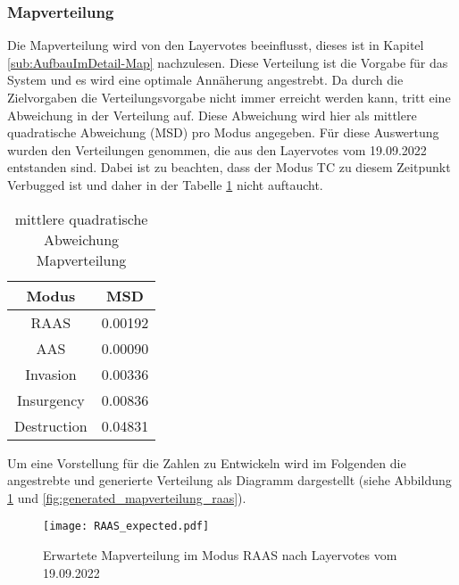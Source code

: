         \subsubsection{Mapverteilung}
            Die Mapverteilung wird von den Layervotes beeinflusst, dieses ist in Kapitel \ref{sub:AufbauImDetail-Map} nachzulesen.
            Diese Verteilung ist die Vorgabe für das System und es wird eine optimale Annäherung angestrebt. Da durch die
            Zielvorgaben die Verteilungsvorgabe nicht immer erreicht werden kann, tritt eine Abweichung in der Verteilung auf.
            Diese Abweichung wird hier als mittlere quadratische Abweichung (MSD) pro Modus angegeben.
            Für diese Auswertung wurden den Verteilungen genommen, die aus den Layervotes vom 19.09.2022 entstanden sind.
            Dabei ist zu beachten, dass der Modus TC zu diesem Zeitpunkt \glqq{}Verbugged\grqq{} ist und daher
            in der Tabelle \ref{t:Ergebnisse:fehler_Mapverteilung} nicht auftaucht.\\
            \begin{table}[h]
                \centering
                \begin{tabular}{|| c c ||}
                    \hline
                    Modus & MSD \\
                    \hline
                    \hline
                    RAAS & 0.00192 \\
                    \hline
                    AAS & 0.00090 \\
                    \hline
                    Invasion & 0.00336 \\
                    \hline
                    Insurgency & 0.00836 \\
                    \hline
                    Destruction & 0.04831 \\
                    \hline
                \end{tabular}
                \caption{mittlere quadratische Abweichung Mapverteilung}
                \label{t:Ergebnisse:fehler_Mapverteilung}
            \end{table}

            Um eine Vorstellung für die Zahlen zu Entwickeln wird im Folgenden die angestrebte und generierte Verteilung als
            Diagramm dargestellt (siehe Abbildung \ref{fig:expected_mapverteilung_raas}
            und \ref{fig:generated_mapverteilung_raas}).

            \begin{figure}[htbp]
                \centering
                \texttt{[image: RAAS\_expected.pdf]}
                \caption{Erwartete Mapverteilung im Modus RAAS nach Layervotes vom 19.09.2022}
                \label{fig:expected_mapverteilung_raas}
            \end{figure}


